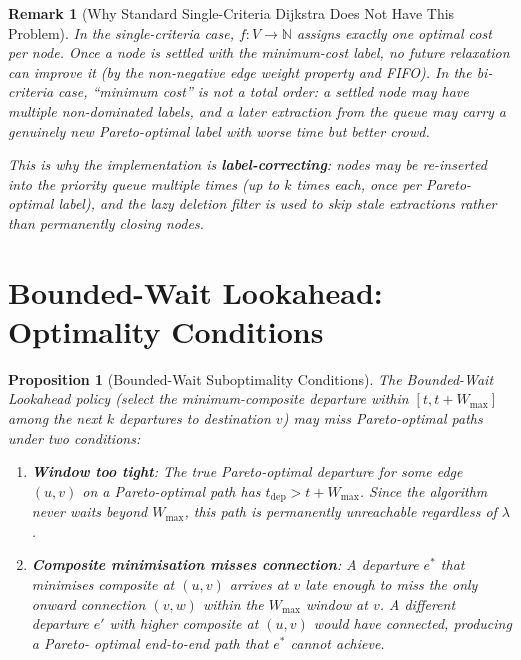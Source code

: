 \documentclass[11pt, a4paper]{article}
\newtheorem{proposition}[theorem]{Proposition}
\newtheorem{remark}[theorem]{Remark}
\theoremstyle{remark}
\newcommand{\N}{\mathbb{N}}
\begin{document}
\begin{remark}[Why Standard Single-Criteria Dijkstra Does Not Have This Problem]
    In the single-criteria case, $f: V \to \N$ assigns exactly one optimal
    cost per node. Once a node is settled with the minimum-cost label, no
    future relaxation can improve it (by the non-negative edge weight property
    and FIFO). In the bi-criteria case, ``minimum cost'' is not a total order:
    a settled node may have multiple non-dominated labels, and a later
    extraction from the queue may carry a genuinely new Pareto-optimal label
    with worse time but better crowd.

    This is why the implementation is \textbf{label-correcting}: nodes may be
    re-inserted into the priority queue multiple times (up to $k$ times each,
    once per Pareto-optimal label), and the lazy deletion filter is used to
    skip stale extractions rather than permanently closing nodes.
\end{remark}

\section{Bounded-Wait Lookahead: Optimality Conditions}

\begin{proposition}[Bounded-Wait Suboptimality Conditions]
    \label{prop:lookahead-suboptimality}
    The Bounded-Wait Lookahead policy (select the minimum-composite departure
    within $[t, t + W_{\max}]$ among the next $k$ departures to destination $v$)
    may miss Pareto-optimal paths under two conditions:

    \begin{enumerate}
        \item \textbf{Window too tight}: The true Pareto-optimal departure for
              some edge $(u,v)$ on a Pareto-optimal path has
              $t_{\text{dep}} > t + W_{\max}$. Since the algorithm never waits
              beyond $W_{\max}$, this path is permanently unreachable regardless
              of $\lambda$.

        \item \textbf{Composite minimisation misses connection}: A departure
              $e^*$ that minimises composite at $(u,v)$ arrives at $v$ late
              enough to miss the only onward connection $(v,w)$ within the
              $W_{\max}$ window at $v$. A different departure $e'$ with higher
              composite at $(u,v)$ would have connected, producing a Pareto-
              optimal end-to-end path that $e^*$ cannot achieve.
    \end{enumerate}
\end{proposition}
\end{document}
